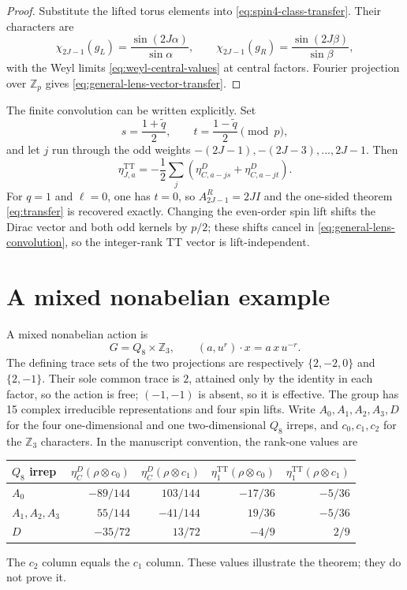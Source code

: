 \documentclass[11pt]{article}
\theoremstyle{definition}
\newcommand{\TT}{\mathrm{TT}}
\begin{document}
\begin{proof}
Substitute the lifted torus elements into
\eqref{eq:spin4-class-transfer}.  Their characters are
\[
 \chi_{2J-1}(g_L)=\frac{\sin(2J\alpha)}{\sin\alpha},
 \qquad
 \chi_{2J-1}(g_R)=\frac{\sin(2J\beta)}{\sin\beta},
\]
with the Weyl limits
\eqref{eq:weyl-central-values} at central factors.  Fourier projection over
$\mathbb Z_p$ gives \eqref{eq:general-lens-vector-transfer}.
\end{proof}

The finite convolution can be written explicitly.  Set
\[
 s=\frac{1+\widetilde q}{2},\qquad
 t=\frac{1-\widetilde q}{2}\pmod p,
\]
and let $j$ run through the odd weights
$-(2J-1),-(2J-3),\ldots,2J-1$.  Then
\begin{equation}
 \eta^{\TT}_{J,a}
 =-\frac12\sum_j\left(
   \eta^D_{C,a-js}+\eta^D_{C,a-jt}
 \right).
 \label{eq:general-lens-convolution}
\end{equation}
For $q=1$ and $\ell=0$, one has $t=0$, so
$A^R_{2J-1}=2JI$ and the one-sided theorem
\eqref{eq:transfer} is recovered exactly.  Changing the even-order spin lift
shifts the Dirac vector and both odd kernels by $p/2$; these shifts cancel in
\eqref{eq:general-lens-convolution}, so the integer-rank TT vector is
lift-independent.

\section{A mixed nonabelian example}
\label{sec:mixed-q8c3}

A mixed nonabelian action is
\begin{equation}
 G=Q_8\times\mathbb Z_3,
 \qquad
 (a,u^r)\cdot x=a\,x\,u^{-r}.
 \label{eq:q8c3-action}
\end{equation}
The defining trace sets of the two projections are respectively
$\{2,-2,0\}$ and $\{2,-1\}$.  Their sole common trace is $2$, attained only
by the identity in each factor, so the action is free; $(-1,-1)$ is absent,
so it is effective.  The group has 15 complex
irreducible representations and four spin lifts.  Write
$A_0,A_1,A_2,A_3,D$ for the four one-dimensional and one two-dimensional
$Q_8$ irreps, and $c_0,c_1,c_2$ for the $\mathbb Z_3$ characters.  In the
manuscript convention, the rank-one values are
\begin{center}
\begin{tabular}{@{}lrrrr@{}}
\toprule
$Q_8$ irrep & $\eta^D_C(\rho\otimes c_0)$ & $\eta^D_C(\rho\otimes c_1)$
& $\eta^{\TT}_1(\rho\otimes c_0)$ & $\eta^{\TT}_1(\rho\otimes c_1)$ \\
\midrule
$A_0$ & $-89/144$ & $103/144$ & $-17/36$ & $-5/36$ \\
$A_1,A_2,A_3$ & $55/144$ & $-41/144$ & $19/36$ & $-5/36$ \\
$D$ & $-35/72$ & $13/72$ & $-4/9$ & $2/9$ \\
\bottomrule
\end{tabular}
\end{center}
The $c_2$ column equals the $c_1$ column.  These values illustrate the
theorem; they do not prove it.
\end{document}
